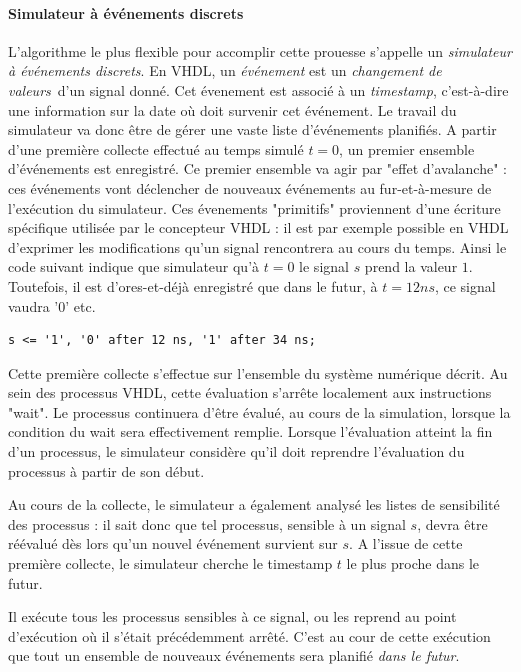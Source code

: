 \paragraph{Simulateur à événements discrets}

L'algorithme le plus flexible pour accomplir cette prouesse s'appelle un {\it simulateur à événements discrets}. En VHDL,
un {\it événement} est un {\it changement de valeurs} d'un signal donné. Cet évenement est associé à un {\it timestamp}, c'est-à-dire
une information sur la date où doit survenir cet événement. Le travail du simulateur va donc être de gérer une vaste liste d'événements
planifiés. A partir d'une première collecte effectué au temps simulé $t=0$, un premier ensemble d'événements est enregistré.
Ce premier ensemble va agir par "effet d'avalanche" : ces événements vont déclencher de nouveaux événements au fur-et-à-mesure
de l'exécution du simulateur. Ces évenements "primitifs" proviennent d'une écriture spécifique utilisée
par le concepteur VHDL : il est par exemple possible en VHDL d'exprimer les modifications qu'un signal rencontrera au cours du temps. Ainsi le code
suivant indique que simulateur qu'à $t=0$ le signal $s$ prend la valeur $1$. Toutefois, il est d'ores-et-déjà enregistré que dans le futur, à $t=12 ns$,
 ce signal vaudra '0' etc.

\begin{lstlisting}[frame=single]
 s <= '1', '0' after 12 ns, '1' after 34 ns;
\end{lstlisting}

Cette première collecte  s'effectue sur l'ensemble du système numérique décrit. Au sein des processus VHDL,
cette évaluation s'arrête localement aux instructions "wait". Le processus continuera d'être évalué, au cours de la simulation,
 lorsque la condition du wait sera effectivement remplie. Lorsque l'évaluation atteint la fin d'un processus, le simulateur considère
 qu'il doit reprendre l'évaluation du processus à partir de son début.

 Au cours de la collecte, le simulateur a également analysé les listes de sensibilité des processus : il sait donc que tel
 processus, sensible à un signal $s$, devra être réévalué dès lors qu'un nouvel événement survient sur $s$.
A l'issue de cette première collecte, le simulateur cherche le timestamp $t$ le plus proche dans le futur.

Il exécute tous les processus sensibles à ce signal, ou les reprend au point d'exécution où il s'était précédemment arrêté.
C'est au cour de cette exécution que tout un ensemble de nouveaux événements sera planifié {\it dans le futur}.

